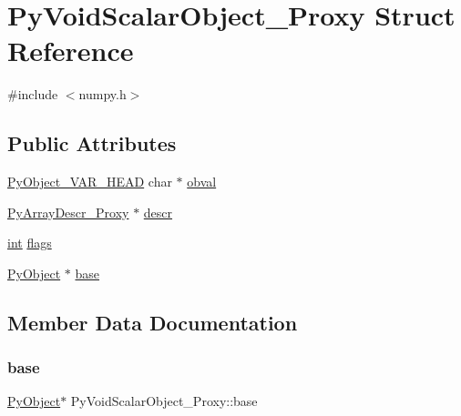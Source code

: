 \hypertarget{struct_py_void_scalar_object___proxy}{}\section{Py\+Void\+Scalar\+Object\+\_\+\+Proxy Struct Reference}
\label{struct_py_void_scalar_object___proxy}


{\ttfamily \#include $<$numpy.\+h$>$}

\subsection*{Public Attributes}
\begin{DoxyCompactItemize}
\item 
\mbox{\hyperlink{_python27_2object_8h_aa0eba161a76be8710b3de325c2e7f9e2}{Py\+Object\+\_\+\+V\+A\+R\+\_\+\+H\+E\+AD}} char $\ast$ \mbox{\hyperlink{struct_py_void_scalar_object___proxy_a546b291985bc240b6cbe49bec86f8f63}{obval}}
\item 
\mbox{\hyperlink{struct_py_array_descr___proxy}{Py\+Array\+Descr\+\_\+\+Proxy}} $\ast$ \mbox{\hyperlink{struct_py_void_scalar_object___proxy_a6e3851062e08d8c71a2c6f5439a595f4}{descr}}
\item 
\mbox{\hyperlink{warnings_8h_a74f207b5aa4ba51c3a2ad59b219a423b}{int}} \mbox{\hyperlink{struct_py_void_scalar_object___proxy_ab6e25ceec2dd6abd59c6f179951266d6}{flags}}
\item 
\mbox{\hyperlink{_python27_2object_8h_aadc84ac7aed2cfa6f20c25f62bf3dac7}{Py\+Object}} $\ast$ \mbox{\hyperlink{struct_py_void_scalar_object___proxy_a5d0fc4a93b91802a12dc3b5e19a67c48}{base}}
\end{DoxyCompactItemize}


\subsection{Member Data Documentation}
\mbox{\label{struct_py_void_scalar_object___proxy_a5d0fc4a93b91802a12dc3b5e19a67c48}} 
\subsubsection{\texorpdfstring{base}{base}}
{\footnotesize\ttfamily \mbox{\hyperlink{_python27_2object_8h_aadc84ac7aed2cfa6f20c25f62bf3dac7}{Py\+Object}}$\ast$ Py\+Void\+Scalar\+Object\+\_\+\+Proxy\+::base}

